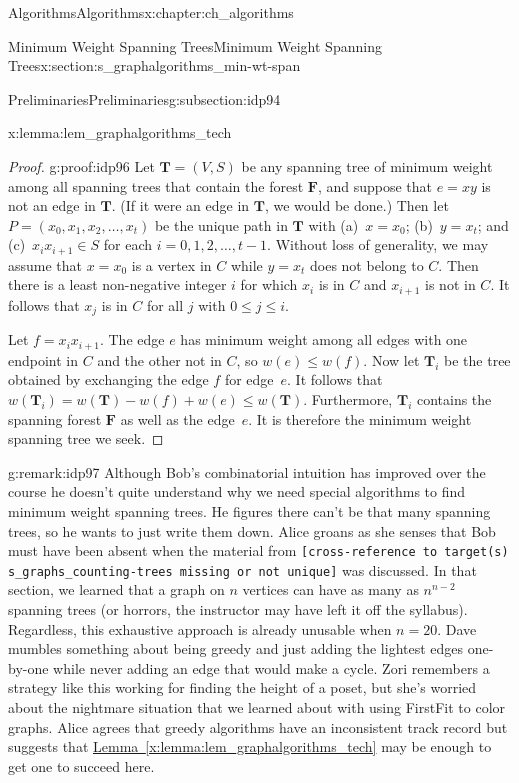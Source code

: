 \documentclass[oneside,10pt,]{book}
\newcommand{\xreffont}{\relax}
\newcommand{\mono}[1]{\texttt{#1}}
\numberwithin{equation}{section}
\newcommand{\bfF}{\mathbf{F}}
\newcommand{\bfT}{\mathbf{T}}
\begin{document}
\begin{chapterptx}{Algorithms}{}{Algorithms}{}{}{x:chapter:ch_algorithms}
\begin{sectionptx}{Minimum Weight Spanning Trees}{}{Minimum Weight Spanning Trees}{}{}{x:section:s_graphalgorithms_min-wt-span}
\begin{subsectionptx}{Preliminaries}{}{Preliminaries}{}{}{g:subsection:idp94}
\begin{lemma}{}{}{x:lemma:lem_graphalgorithms_tech}
\end{lemma}
\begin{proof}{}{g:proof:idp96}
Let \(\bfT=(V,S)\) be any spanning tree of minimum weight among all spanning trees that contain the forest \(\bfF\), and suppose that \(e=xy\) is not an edge in \(\bfT\). (If it were an edge in \(\bfT\), we would be done.) Then let \(P=(x_0,x_1,x_2,\dots,x_t)\) be the unique path in \(\bfT\) with (a)~\(x=x_0\); (b)~\(y=x_t\); and (c)~\(x_ix_{i+1}\in S\) for each \(i=0,1,2,\dots,t-1\). Without loss of generality, we may assume that \(x=x_0\) is a vertex in \(C\) while \(y=x_t\) does not belong to \(C\). Then there is a least non-negative integer \(i\) for which \(x_i\) is in \(C\) and \(x_{i+1}\) is not in \(C\). It follows that \(x_j\) is in \(C\) for all \(j\) with \(0\le j\le i\).%
\par
Let \(f=x_ix_{i+1}\). The edge \(e\) has minimum weight among all edges with one endpoint in \(C\) and the other not in \(C\), so \(w(e)\le w(f)\). Now let \(\bfT_i\) be the tree obtained by exchanging the edge \(f\) for edge~\(e\). It follows that \(w(\bfT_i) = w(\bfT) - w(f) +w(e)\le w(\bfT)\). Furthermore, \(\bfT_i\) contains the spanning forest \(\bfF\) as well as the edge~\(e\). It is therefore the minimum weight spanning tree we seek.%
\end{proof}
\begin{remark}{}{g:remark:idp97}%
Although Bob's combinatorial intuition has improved over the course he doesn't quite understand why we need special algorithms to find minimum weight spanning trees. He figures there can't be that many spanning trees, so he wants to just write them down. Alice groans as she senses that Bob must have been absent when the material from \mono{[cross-reference to target(s) \textquotedbl{}s\_graphs\_counting-trees\textquotedbl{} missing or not unique]} was discussed. In that section, we learned that a graph on \(n\) vertices can have as many as \(n^{n-2}\) spanning trees (or horrors, the instructor may have left it off the syllabus). Regardless, this exhaustive approach is already unusable when \(n = 20\). Dave mumbles something about being greedy and just adding the lightest edges one-by-one while never adding an edge that would make a cycle. Zori remembers a strategy like this working for finding the height of a poset, but she's worried about the nightmare situation that we learned about with using FirstFit to color graphs. Alice agrees that greedy algorithms have an inconsistent track record but suggests that \hyperref[x:lemma:lem_graphalgorithms_tech]{Lemma~{\xreffont\ref{x:lemma:lem_graphalgorithms_tech}}} may be enough to get one to succeed here.%

\end{remark}
\end{subsectionptx}
\end{sectionptx}
\end{chapterptx}
\end{document}
